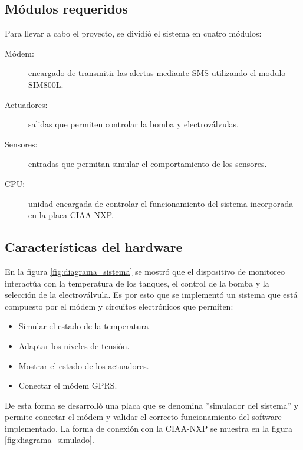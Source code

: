\subsection{ Módulos requeridos}
Para llevar a cabo el proyecto, se dividió el sistema en cuatro módulos:
\begin{description}
  \item[Módem:] encargado de transmitir las alertas mediante SMS utilizando el modulo SIM800L.
  \item[Actuadores:] salidas que permiten controlar la bomba y electroválvulas.
  \item[Sensores:] entradas que permitan simular el comportamiento de los sensores.
  \item[CPU:] unidad encargada de controlar el funcionamiento del sistema incorporada en la placa CIAA-NXP. 
\end{description}

\subsection{Características del hardware}
\label{hw_placa}

En la figura \ref{fig:diagrama_sistema} se mostró que el dispositivo de monitoreo interactúa con la temperatura de los tanques, el control de la bomba y la selección de la electroválvula. Es por esto que se implementó un sistema que está compuesto por el módem y circuitos electrónicos que permiten:
\begin{itemize}
  \item Simular el estado de la temperatura
  \item Adaptar los niveles de tensión.
  \item Mostrar el estado de los actuadores.
  \item Conectar el módem GPRS.
\end{itemize}

    De esta forma se desarrolló una placa que se denomina ''simulador del sistema'' y permite conectar el módem y validar el correcto funcionamiento del software implementado. La forma de conexión con la CIAA-NXP se muestra en la figura \ref{fig:diagrama_simulado}.

